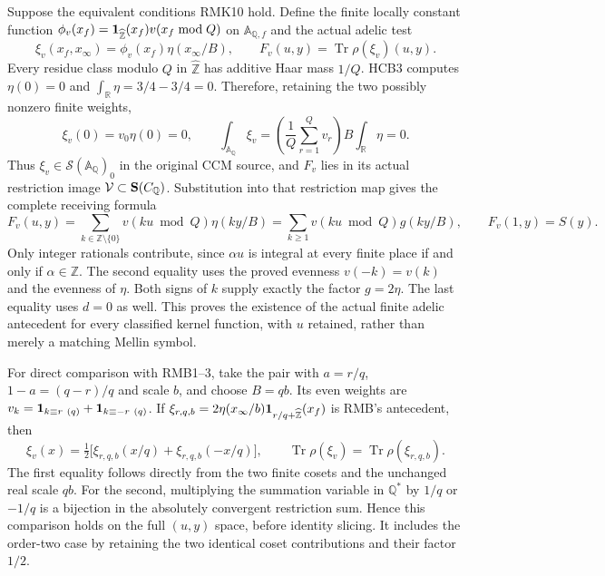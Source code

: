 \documentclass[11pt]{article}
\begin{document}
Suppose the equivalent conditions RMK10 hold. Define the finite
locally constant function
$\phi_v(x_f)={\bf1}_{\widehat{\mathbb Z}}(x_f)
v(x_f\bmod Q)$ on $\mathbb A_{\mathbb Q,f}$ and the actual adelic test
\begin{equation}\tag{RMK17}
 \xi_v(x_f,x_\infty)=\phi_v(x_f)\eta(x_\infty/B),\qquad
 F_v(u,y)=\operatorname{Tr}\rho(\xi_v)(u,y).
\end{equation}
Every residue class modulo $Q$ in $\widehat{\mathbb Z}$ has additive
Haar mass $1/Q$. HCB3 computes $\eta(0)=0$ and
$\int_{\mathbb R}\eta=3/4-3/4=0$. Therefore, retaining the two
possibly nonzero finite weights,
\begin{equation}\tag{RMK18}
 \xi_v(0)=v_0\eta(0)=0,\qquad
 \int_{\mathbb A_{\mathbb Q}}\xi_v
       =\left(\frac1Q\sum_{r=1}^Qv_r\right)B
                   \int_{\mathbb R}\eta=0.
\end{equation}
Thus $\xi_v\in\mathcal S(\mathbb A_{\mathbb Q})_0$ in the original
CCM source, and $F_v$ lies in its actual restriction image
$\mathcal V\subset{\bf S}(C_{\mathbb Q})$. Substitution into that
restriction map gives the complete receiving formula
\begin{equation}\tag{RMK19}
 F_v(u,y)=\sum_{k\in\mathbb Z\setminus\{0\}}
       v(ku\bmod Q)\eta(ky/B)
       =\sum_{k\geq1}v(ku\bmod Q)g(ky/B),\qquad
 F_v(1,y)=S(y).
\end{equation}
Only integer rationals contribute, since $\alpha u$ is integral at
every finite place if and only if $\alpha\in\mathbb Z$.
The second equality uses the proved evenness $v(-k)=v(k)$ and the
evenness of $\eta$. Both signs of $k$ supply exactly the factor
$g=2\eta$. The last equality uses $d=0$ as well. This proves the
existence of the actual finite adelic antecedent for every classified
kernel function, with $u$ retained, rather than merely a matching
Mellin symbol.

For direct comparison with RMB1--3, take the pair with
$a=r/q$, $1-a=(q-r)/q$ and scale $b$, and choose $B=qb$.
Its even weights are
$v_k={\bf1}_{k\equiv r\ (q)}+{\bf1}_{k\equiv-r\ (q)}$.
If $\xi_{r,q,b}=2\eta(x_\infty/b)
{\bf1}_{r/q+\widehat{\mathbb Z}}(x_f)$ is RMB's antecedent, then
\begin{equation}\tag{RMK20}
 \xi_v(x)=\tfrac12\big[\xi_{r,q,b}(x/q)
                            +\xi_{r,q,b}(-x/q)\big],\qquad
 \operatorname{Tr}\rho(\xi_v)=\operatorname{Tr}\rho(\xi_{r,q,b}).
\end{equation}
The first equality follows directly from the two finite cosets and
the unchanged real scale $qb$. For the second, multiplying the
summation variable in $\mathbb Q^*$ by $1/q$ or $-1/q$ is a
bijection in the absolutely convergent restriction sum. Hence this
comparison holds on the full $(u,y)$ space, before identity slicing.
It includes the order-two case by retaining the two identical
coset contributions and their factor $1/2$.
\end{document}
